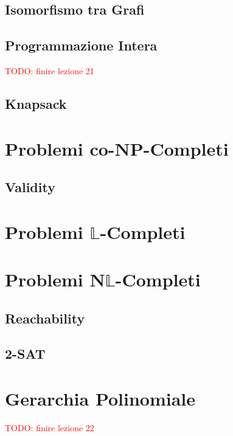 \section{Isomorfismo tra Grafi}



\section{Programmazione Intera}

\textcolor{Red}{TODO: finire lezione 21}


\section{Knapsack}




\chapter{Problemi co-NP-Completi}


\section{Validity}





\chapter{Problemi $\mathbb{L}$-Completi}





\chapter{Problemi N$\mathbb{L}$-Completi}

\section{Reachability}


\section{2-SAT}





\chapter{Gerarchia Polinomiale}


\textcolor{Red}{TODO: finire lezione 22}